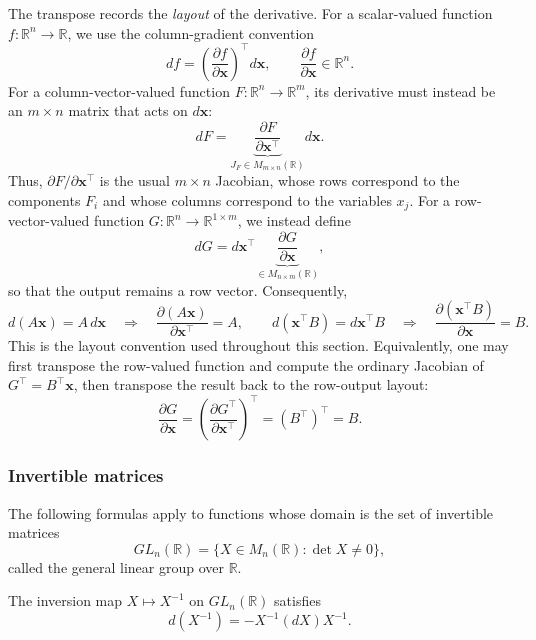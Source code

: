 \begin{remark}
The transpose records the \emph{layout} of the derivative. For a scalar-valued function
$f:\mathbb{R}^n\to\mathbb{R}$, we use the column-gradient convention
\[
    df
    =
    \left(\frac{\partial f}{\partial\mathbf{x}}\right)^{\top}d\mathbf{x},
    \qquad
    \frac{\partial f}{\partial\mathbf{x}}\in\mathbb{R}^n.
\]
For a column-vector-valued function
$F:\mathbb{R}^n\to\mathbb{R}^m$, its derivative must instead be an
$m\times n$ matrix that acts on $d\mathbf{x}$:
\[
    dF
    =
    \underbrace{\frac{\partial F}{\partial\mathbf{x}^{\top}}}_{J_F\in M_{m\times n}(\mathbb{R})}
    d\mathbf{x}.
\]
Thus, $\partial F/\partial\mathbf{x}^{\top}$ is the usual $m\times n$
Jacobian, whose rows correspond to the components $F_i$ and whose columns
correspond to the variables $x_j$. For a row-vector-valued function
$G:\mathbb{R}^n\to\mathbb{R}^{1\times m}$, we instead define
\[
    dG
    =
    d\mathbf{x}^{\top}
    \underbrace{\frac{\partial G}{\partial\mathbf{x}}}_{\in M_{n\times m}(\mathbb{R})},
\]
so that the output remains a row vector. Consequently,
\[
    d(A\mathbf{x})=A\,d\mathbf{x}
    \quad\Longrightarrow\quad
    \frac{\partial(A\mathbf{x})}{\partial\mathbf{x}^{\top}}=A,
    \qquad
    d(\mathbf{x}^{\top}B)=d\mathbf{x}^{\top}B
    \quad\Longrightarrow\quad
    \frac{\partial(\mathbf{x}^{\top}B)}{\partial\mathbf{x}}=B.
\]
This is the layout convention used throughout this section. Equivalently, one
may first transpose the row-valued function and compute the ordinary Jacobian
of $G^{\top}=B^{\top}\mathbf{x}$, then transpose the result back to the
row-output layout:
\[
    \frac{\partial G}{\partial\mathbf{x}}
    =
    \left(
        \frac{\partial G^{\top}}{\partial\mathbf{x}^{\top}}
    \right)^{\top}
    =
    (B^{\top})^{\top}
    =B.
\]
\end{remark}

\subsubsection*{Invertible matrices}

The following formulas apply to functions whose domain is the set of invertible matrices
\[
    GL_n(\mathbb{R})=\{X\in M_n(\mathbb{R}):\det X\ne 0\},
\]
called the general linear group over $\mathbb{R}$.

\begin{theorem}[Inversion]
The inversion map $X\mapsto X^{-1}$ on $GL_n(\mathbb{R})$ satisfies
\[
    d(X^{-1})=-X^{-1}(dX)X^{-1}.
\]
\end{theorem}

